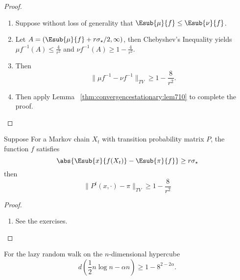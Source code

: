 \documentclass[12pt]{article}
\begin{document}
\begin{proof}
    \begin{enumerate}
        \item
            Suppose without loss of generality that \( \Esub{\mu}{f} \le
            \Esub{\nu}{f} \).
        \item
            Let \( A = (\Esub{\mu}{f} + r\sigma_{\star}/2, \infty) \),
            then Chebyshev's Inequality yields \( \mu f^{-1}(A) \le
            \frac{4}{r^2} \) and \( \nu f^{-1}(A) \ge 1 - \frac{4}{r^2} \).
        \item
            Then
            \[
                \| \mu f^{-1} -\nu f^{-1} \|_{TV} \ge 1 - \frac{8}{r^2}.
            \]
        \item
            Then apply Lemma~%
            \ref{thm:convergencestationary:lem710} to complete the
            proof.
    \end{enumerate}
\end{proof}

\begin{corollary}
    \label{thm:convergencestationary:cor79} Suppose For a Markov chain \(
    X_t \) with transition probability matrix \( P \), the function \( f
    \) satisfies
    \[
        \abs{ \Esub{x}{f(X_t)} - \Esub{\pi}{f}} \ge r \sigma_{\star}
    \] then
    \[
        \| P^t(x, \cdot) - \pi \|_{TV} \ge 1 - \frac{8}{r^2}
    \]
\end{corollary}

\begin{proof}
    \begin{enumerate}
        \item
            See the exercises.
    \end{enumerate}
\end{proof}

\begin{proposition}
    For the lazy random walk on the \( n \)-dimensional hypercube
    \[
        d \left( \frac{1}{2} n \log n - \alpha n \right) \ge 1 - 8^{2 -
        2\alpha}.
    \]
\end{proposition}
\end{document}
